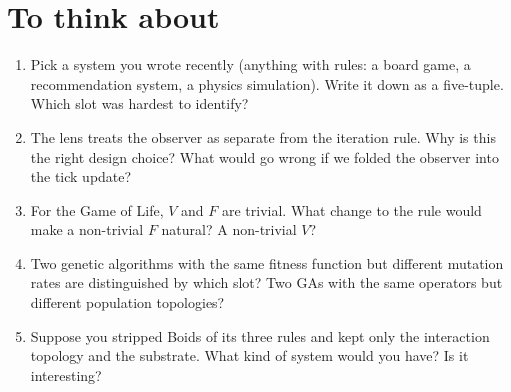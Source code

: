 \section*{To think about}

\begin{enumerate}
  \item Pick a system you wrote recently (anything with rules: a board
    game, a recommendation system, a physics simulation). Write it down
    as a five-tuple. Which slot was hardest to identify?
  \item The lens treats the observer as separate from the iteration
    rule. Why is this the right design choice? What would go wrong if
    we folded the observer into the tick update?
  \item For the Game of Life, $V$ and $F$ are trivial. What change to
    the rule would make a non-trivial $F$ natural? A non-trivial $V$?
  \item Two genetic algorithms with the same fitness function but
    different mutation rates are distinguished by which slot? Two GAs
    with the same operators but different population topologies?
  \item Suppose you stripped Boids of its three rules and kept only the
    interaction topology and the substrate. What kind of system would
    you have? Is it interesting?
\end{enumerate}
